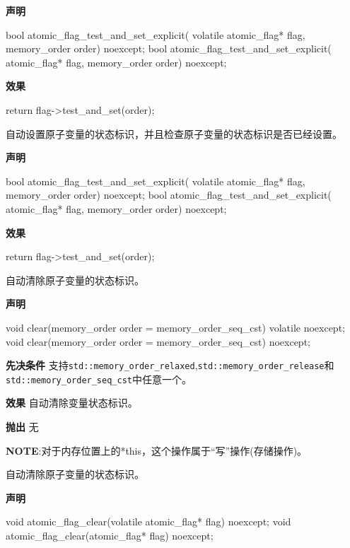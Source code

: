 \textbf{声明}

\begin{cpp}
bool atomic_flag_test_and_set_explicit(
    volatile atomic_flag* flag, memory_order order) noexcept;
bool atomic_flag_test_and_set_explicit(
    atomic_flag* flag, memory_order order) noexcept;
\end{cpp}

\textbf{效果}

\begin{cpp}
return flag->test_and_set(order);
\end{cpp}


自动设置原子变量的状态标识，并且检查原子变量的状态标识是否已经设置。

\textbf{声明}

\begin{cpp}
bool atomic_flag_test_and_set_explicit(
    volatile atomic_flag* flag, memory_order order) noexcept;
bool atomic_flag_test_and_set_explicit(
    atomic_flag* flag, memory_order order) noexcept;
\end{cpp}

\textbf{效果}

\begin{cpp}
return flag->test_and_set(order);
\end{cpp}


自动清除原子变量的状态标识。

\textbf{声明}

\begin{cpp}
void clear(memory_order order = memory_order_seq_cst) volatile noexcept;
void clear(memory_order order = memory_order_seq_cst) noexcept;
\end{cpp}

\textbf{先决条件}
支持\texttt{std::memory\_order\_relaxed},\texttt{std::memory\_order\_release}和\texttt{std::memory\_order\_seq\_cst}中任意一个。


\textbf{效果}
自动清除变量状态标识。

\textbf{抛出}
无

\textbf{NOTE}:对于内存位置上的*this，这个操作属于“写”操作(存储操作)。



自动清除原子变量的状态标识。

\textbf{声明}

\begin{cpp}
void atomic_flag_clear(volatile atomic_flag* flag) noexcept;
void atomic_flag_clear(atomic_flag* flag) noexcept;
\end{cpp}

